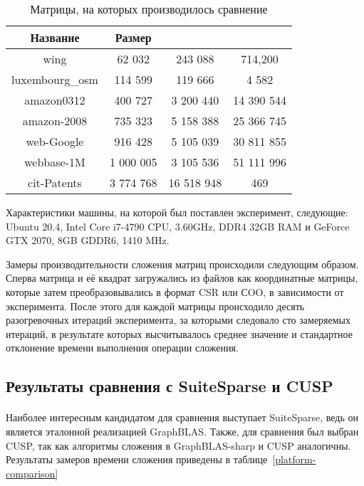 \documentclass[14pt]{matmex-diploma-custom}
\begin{document}
\begin{table}[h]
\center{}

\begin{tabular}{ | c || c | c | c | }
\hline
Название & Размер & \parbox[c][2.5cm][t]{3cm}{} & \parbox[c][3.5cm][t]{3cm}{} \\ \hline
\hline
wing & 62 032 & 243 088 & 714,200 \\ \hline
luxembourg\_osm & 114 599 & 119 666 & 4 582 \\ \hline
amazon0312 & 400 727 & 3 200 440 & 14 390 544 \\ \hline
amazon-2008 & 735 323 & 5 158 388 & 25 366 745 \\ \hline
web-Google & 916 428 & 5 105 039 & 30 811 855 \\ \hline
webbase-1M & 1 000 005 & 3 105 536 & 51 111 996 \\ \hline
cit-Patents & 3 774 768 & 16 518 948 & 469 \\ \hline
\end{tabular}

\caption{Матрицы, на которых производилось сравнение}
\label{matrices}
\end{table}

Характеристики машины, на которой был поставлен эксперимент, следующие: Ubuntu 20.4, Intel Core i7-4790 CPU, 3.60GHz, DDR4 32GB RAM и GeForce GTX 2070, 8GB GDDR6, 1410 MHz.

Замеры производительности сложения матриц происходили следующим образом. Сперва матрица и её квадрат загружались из файлов как координатные матрицы, которые затем преобразовывались в формат CSR или СOO, в зависимости от эксперимента. После этого для каждой матрицы происходило десять разогревочных итераций эксперимента, за которыми следовало сто замеряемых итераций, в результате которых высчитывалось среднее значение и стандартное отклонение времени выполнения операции сложения.

\subsection{Результаты сравнения с SuiteSparse и CUSP}
\paragraph{}Наиболее интересным кандидатом для сравнения выступает SuiteSparse, ведь он является эталонной реализацией GraphBLAS. Также, для сравнения был выбран CUSP, так как алгоритмы сложения в GraphBLAS-sharp и CUSP аналогичны. Результаты замеров времени сложения приведены в таблице~\ref{platform-comparison}
\end{document}
